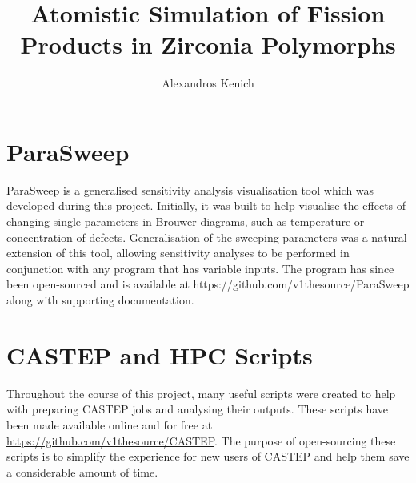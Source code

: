 \documentclass[a4paper,12pt,twoside]{report}
\begin{document}

\title{\LARGE {\bf Atomistic Simulation of Fission Products in Zirconia Polymorphs}
}

\author{Alexandros Kenich}

\normallinespacing
\maketitle




\preface
%
%

\body

\doublespacing


\label{References}
\renewcommand\bibname{References}



\appendix
\label{Appendix}

\chapter{ParaSweep}

ParaSweep is a generalised sensitivity analysis visualisation tool which was developed during this project. Initially, it was built to help visualise the effects of changing single parameters in Brouwer diagrams, such as temperature or concentration of defects. Generalisation of the sweeping parameters was a natural extension of this tool, allowing sensitivity analyses to be performed in conjunction with any program that has variable inputs. The program has since been open-sourced and is available at https://github.com/v1thesource/ParaSweep along with supporting documentation.

\chapter{CASTEP and HPC Scripts}
\label{castep_scripts}

Throughout the course of this project, many useful scripts were created to help with preparing CASTEP jobs and analysing their outputs. These scripts have been made available online and for free at \href{https://github.com/v1thesource/CASTEP}{https://github.com/v1thesource/CASTEP}. The purpose of open-sourcing these scripts is to simplify the experience for new users of CASTEP and help them save a considerable amount of time.
\end{document}
